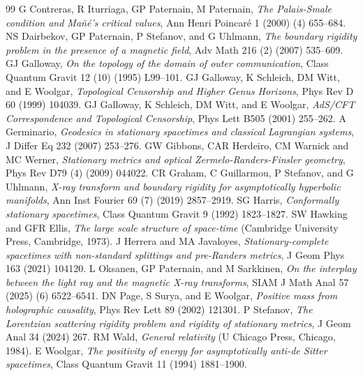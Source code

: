 \documentclass[12pt]{amsart}
\numberwithin{equation}{section}
\begin{document}
\begin{thebibliography}{99}
G Contreras, R Iturriaga, GP Paternain, M Paternain, \emph{The Palais-Smale condition and Mañé's critical values}, Ann Henri Poincaré 1 (2000) (4) 655--684.
 NS Dairbekov, GP Paternain, P Stefanov, and G Uhlmann, \emph{The boundary rigidity problem in the presence of a magnetic field}, Adv Math 216 (2) (2007) 535--609.
 GJ Galloway, \emph{On the topology of the domain of outer communication}, Class Quantum Gravit 12 (10) (1995) L99--101.
 GJ Galloway, K Schleich, DM Witt, and E Woolgar, \emph{Topological Censorship and Higher Genus Horizons}, Phys Rev D 60 (1999) 104039.
 GJ Galloway, K Schleich, DM Witt, and E Woolgar, \emph{AdS/CFT Correspondence and Topological Censorship}, Phys Lett B505 (2001) 255--262.
 A Germinario, \emph{Geodesics in stationary spacetimes and classical Lagrangian systems}, J Differ Eq 232 (2007) 253--276.
 GW Gibbons, CAR Herdeiro, CM Warnick and MC Werner, \emph{Stationary metrics and optical Zermelo-Randers-Finsler geometry}, Phys Rev D79 (4) (2009) 044022.
 CR Graham, C Guillarmou, P Stefanov, and G Uhlmann, \emph{X-ray transform and boundary rigidity for asymptotically hyperbolic manifolds}, Ann Inst Fourier 69 (7) (2019) 2857--2919.
 SG Harris, \emph{Conformally stationary spacetimes}, Class Quantum Gravit 9 (1992) 1823--1827.
 SW Hawking and GFR Ellis, \emph{The large scale structure of space-time} (Cambridge University Press, Cambridge, 1973).
J Herrera and MA Javaloyes,
\emph{Stationary-complete spacetimes with non-standard splittings and pre-Randers metrics},
J Geom Phys 163 (2021) 104120.
 L Oksanen, GP Paternain, and M Sarkkinen, \emph{On the interplay between the light ray and the magnetic X-ray transforms}, SIAM J Math Anal 57 (2025) (6) 6522--6541.
 DN Page, S Surya, and E Woolgar, \emph{Positive mass from holographic causality}, Phys Rev Lett 89 (2002) 121301.
 P Stefanov, \emph{The Lorentzian scattering rigidity problem and rigidity of stationary metrics}, J Geom Anal 34 (2024) 267.
 RM Wald, \emph{General relativity} (U Chicago Press, Chicago, 1984).
 E Woolgar, \emph{The positivity of energy for asymptotically anti-de Sitter spacetimes}, Class Quantum Gravit 11 (1994) 1881--1900.
\end{thebibliography}
\end{document}
